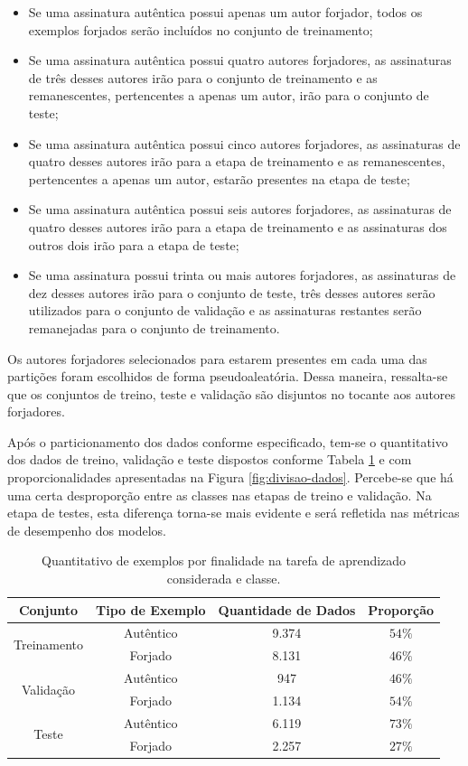 \begin{itemize}
	\item Se uma assinatura autêntica possui apenas um autor forjador, todos os exemplos forjados serão incluídos no conjunto de treinamento;
	\item Se uma assinatura autêntica possui quatro autores forjadores, as assinaturas de três desses autores irão para o conjunto de treinamento e as remanescentes, pertencentes a apenas um autor, irão para o conjunto de teste;
	\item Se uma assinatura autêntica possui cinco autores forjadores, as assinaturas de quatro desses autores irão para a etapa de treinamento e as remanescentes, pertencentes a apenas um autor, estarão presentes na etapa de teste;
	\item Se uma assinatura autêntica possui seis autores forjadores, as assinaturas de quatro desses autores irão para a etapa de treinamento e as assinaturas dos outros dois irão para a etapa de teste;
	\item Se uma assinatura possui trinta ou mais autores forjadores, as assinaturas de dez desses autores irão para o conjunto de teste, três desses autores serão utilizados para o conjunto de validação e as assinaturas restantes serão remanejadas para o conjunto de treinamento.
\end{itemize}

Os autores forjadores selecionados para estarem presentes em cada uma das partições foram escolhidos de forma pseudoaleatória. Dessa maneira, ressalta-se que os conjuntos de treino, teste e validação são disjuntos no tocante aos autores forjadores.

Após o particionamento dos dados conforme especificado, tem-se o quantitativo dos dados de treino, validação e teste dispostos conforme Tabela \ref{tab:divisao-dados} e com proporcionalidades apresentadas na Figura \ref{fig:divisao-dados}. Percebe-se que há uma certa desproporção entre as classes nas etapas de treino e validação. Na etapa de testes, esta diferença torna-se mais evidente e será refletida nas métricas de desempenho dos modelos.

\begin{table}[h!]
	\centering
	\caption{Quantitativo de exemplos por finalidade na tarefa de aprendizado considerada e classe.}
	\label{tab:divisao-dados}
	\begin{tabular}{c c c c}
		\toprule
		\textbf{Conjunto} & \textbf{Tipo de Exemplo} & \textbf{Quantidade de Dados} & \textbf{Proporção}\\
		\midrule
		\multirow{2}{*}{Treinamento} & Autêntico & 9.374 & $54\%$ \\
    & Forjado & 8.131 & $46\%$\\
     \midrule
		 \multirow{2}{*}{Validação} & Autêntico & 947 & $46\%$ \\
     & Forjado & 1.134 & $54\%$\\
		 \midrule
		 \multirow{2}{*}{Teste} & Autêntico & 6.119 & $73\%$ \\
     & Forjado & 2.257 & $27\%$\\
		\bottomrule
	\end{tabular}
\end{table}

